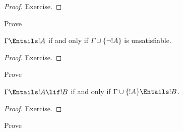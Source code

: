 \documentclass[../../../include/open-logic-section]{subfiles}
\begin{document}
\begin{proof}
Exercise.
\end{proof}

\begin{prob}
Prove 
\end{prob}

\begin{prop}
  $\Gamma \Entails !A$ if and only if $\Gamma \cup \{\lnot !A\}$
  is unsatisfiable.
\end{prop}

\begin{proof}
Exercise.
\end{proof}

\begin{prob}
Prove 
\end{prob}

\begin{thm}
   $\Gamma \Entails !A \lif !B$ if and only
  if $\Gamma \cup \{!A\} \Entails !B$.
\end{thm}

\begin{proof}
Exercise.
\end{proof}

\begin{prob}
Prove 
\end{prob}
\end{document}
